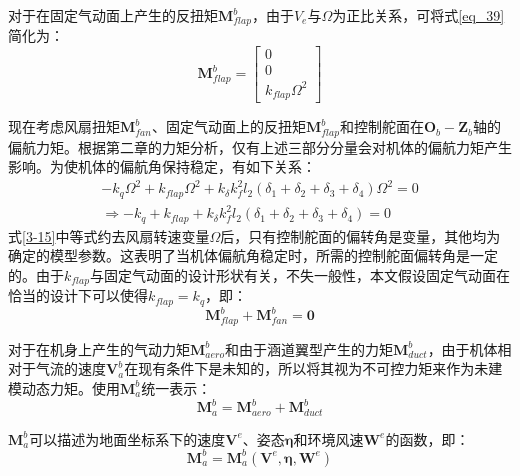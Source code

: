 对于在固定气动面上产生的反扭矩$\boldsymbol{M}_{flap}^b$，由于$V_{e}$与$\Omega$为正比关系，可将式\ref{eq_39}简化为：
\begin{equation}
    \boldsymbol{M}_{flap}^b=
    \begin{bmatrix}
    0 \\0 \\k_{flap}\Omega^2
    \end{bmatrix}
    \label{3-15}
\end{equation}

现在考虑风扇扭矩$\boldsymbol{M}_{fan}^b$、固定气动面上的反扭矩$\boldsymbol{M}_{flap}^b$和控制舵面在$\boldsymbol{O}_b-\boldsymbol{Z}_b$轴的偏航力矩。根据第二章的力矩分析，仅有上述三部分分量会对机体的偏航力矩产生影响。为使机体的偏航角保持稳定，有如下关系：
\begin{equation}
    \begin{gathered}
    -k_q\Omega^2+k_{flap}\Omega^2+k_{\delta}k_f^2 l_2(\delta_1 + \delta_2 + \delta_3 + \delta_4)\Omega^2=0
     \\
     \Rightarrow
    -k_q+k_{flap}+k_{\delta}k_f^2 l_2(\delta_1 + \delta_2 + \delta_3 + \delta_4)=0
    \end{gathered}
    \label{3-16}
\end{equation}
式\ref{3-15}中等式约去风扇转速变量$\Omega$后，只有控制舵面的偏转角是变量，其他均为确定的模型参数。这表明了当机体偏航角稳定时，所需的控制舵面偏转角是一定的。由于$k_{flap}$与固定气动面的设计形状有关，不失一般性，本文假设固定气动面在恰当的设计下可以使得$k_{flap}=k_{q}$，即：
\begin{equation}
    \boldsymbol{M}_{flap}^b + \boldsymbol{M}_{fan}^b = \boldsymbol{0}
\label{3-17}
\end{equation}

对于在机身上产生的气动力矩$\boldsymbol{M}_{aero}^b$和由于涵道翼型产生的力矩$\boldsymbol{M}_{duct}^b$，由于机体相对于气流的速度$\boldsymbol{V}_a^b$在现有条件下是未知的，所以将其视为不可控力矩来作为未建模动态力矩。使用$\boldsymbol{M}_{a}^b$统一表示：
\begin{equation}
    \boldsymbol{M}_{a}^b=\boldsymbol{M}_{aero}^b+\boldsymbol{M}_{duct}^b
    \label{3-18}
\end{equation}

$\boldsymbol{M}_{a}^b$可以描述为地面坐标系下的速度$\boldsymbol{V}^e$、姿态$\boldsymbol{\eta}$和环境风速$\boldsymbol{W}^e$的函数，即：
\begin{equation}
    \boldsymbol{M}_{a}^b=\boldsymbol{M}_{a}^b(\boldsymbol{V}^e,\boldsymbol{\eta},\boldsymbol{W}^e)
    \label{3-19}
\end{equation}

